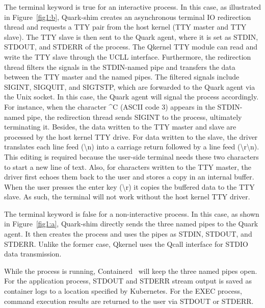 The terminal keyword is true for an interactive process. In this case, as illustrated in Figure~\ref{fig1:b}, Quark-shim creates an asynchronous terminal IO redirection thread and requests a TTY pair from the host kernel (TTY master and TTY slave). The TTY 
slave is then sent to the Quark agent, where it is set as STDIN, STDOUT, and STDERR of the process. The Qkernel TTY module can read and write the TTY slave through the UCLL interface. Furthermore, the redirection thread filters the signals in the STDIN-named pipe and 
transfers the data between the TTY master and the named pipes. The filtered signals include SIGINT, SIGQUIT, and SIGTSTP, which are forwarded to the Quark agent via the Unix socket. In this case, the Quark agent will signal the process accordingly. For instance, when the character \textasciicircum C (ASCII code 3) appears in 
the STDIN-named pipe, the redirection thread sends SIGINT to the process, ultimately terminating it. Besides, the data written to the TTY master and slave are processed by the host kernel TTY drive. For data written to the slave, the driver translates each line feed (\textbackslash n) into a carriage return
 followed by a line feed (\textbackslash r\textbackslash n). This editing is required because the user-side terminal needs these two characters to start a new line of text. Also, for characters written to the TTY master, the driver first echoes them back to the user and stores a copy in an internal buffer. When the user presses the enter key (\textbackslash r) it 
 copies the buffered data to the TTY slave. As such, the terminal will not work without the host kernel TTY driver.

The terminal keyword is false for a non-interactive process. In this case, as shown in Figure~\ref{fig1:a}, Quark-shim directly sends the three named pipes to the Quark agent. It then creates the process and uses the pipes as STDIN, STDOUT, and STDERR. 
Unlike the former case, Qkernel uses the Qcall interface for STDIO data transmission.

While the process is running, Containerd~\cite*{containerd} will keep the three named pipes open. For the application process, STDOUT and STDERR stream output is saved as container logs to a location specified by Kubernetes. For the EXEC process, command execution results are returned to the user via 
STDOUT or STDERR.


